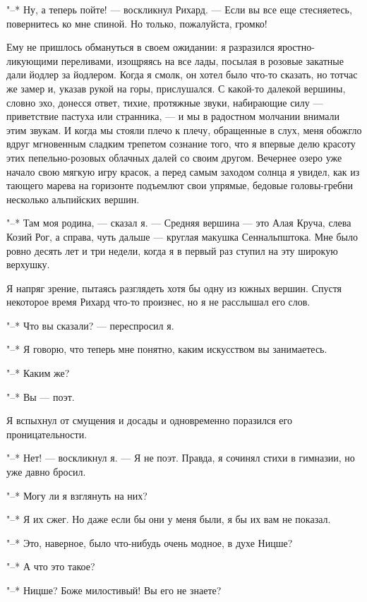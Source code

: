 "--* Ну,  а теперь пойте! ---  воскликнул Рихард. --- Если  вы все еще
стесняетесь, повернитесь ко мне спиной. Но только, пожалуйста, громко!

Ему   не  пришлось   обмануться   в  своем   ожидании:  я   разразился
яростно-ликующими переливами, изощряясь на все лады, посылая в розовые
закатные дали йодлер за йодлером. Когда  я смолк, он хотел было что-то
сказать, но  тотчас же замер и,  указав рукой на горы,  прислушался. С
какой-то далекой вершины, словно  эхо, донесся ответ, тихие, протяжные
звуки, набирающие  силу --- приветствие  пастуха или странника,  --- и
мы  в  радостном молчании  внимали  этим  звукам.  И когда  мы  стояли
плечо  к  плечу, обращенные  в  слух,  меня обожгло  вдруг  мгновенным
сладким  трепетом  сознание того,  что  я  впервые делю  красоту  этих
пепельно-розовых облачных  далей со  своим другом. Вечернее  озеро уже
начало свою мягкую игру красок, а перед самым заходом солнца я увидел,
как из  тающего марева  на горизонте  подъемлют свои  упрямые, бедовые
головы-гребни несколько альпийских вершин.

"--* Там  моя родина, --- сказал  я. --- Средняя вершина  --- это Алая
Круча,  слева Козий  Рог, а  справа, чуть  дальше ---  круглая макушка
Сеннальпштока.  Мне было  ровно десять  лет и  три недели,  когда я  в
первый раз ступил на эту широкую верхушку.

Я  напряг зрение,  пытаясь разглядеть  хотя бы  одну из  южных вершин.
Спустя некоторое время  Рихард что-то произнес, но я  не расслышал его
слов.

"--* Что вы сказали? --- переспросил я.

"--*  Я   говорю,  что  теперь   мне  понятно,  каким   искусством  вы
занимаетесь.

"--* Каким же?

"--* Вы --- поэт.

Я  вспыхнул  от  смущения  и   досады  и  одновременно  поразился  его
проницательности.

"--* Нет! --- воскликнул  я. --- Я не поэт. Правда,  я сочинял стихи в
гимназии, но уже давно бросил.

"--* Могу ли я взглянуть на них?

"--* Я  их сжег.  Но даже  если бы  они у меня  были, я  бы их  вам не
показал.

"--* Это, наверное, было что-нибудь очень модное, в духе Ницше?

"--* А что это такое?

"--* Ницше? Боже милостивый! Вы его не знаете?

